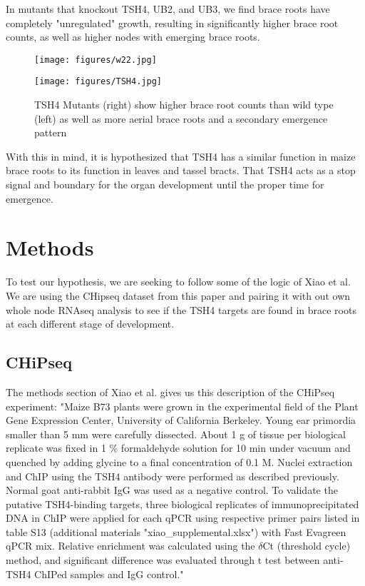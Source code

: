 In mutants that knockout TSH4, UB2, and UB3, we find brace roots have completely "unregulated" growth, resulting in significantly higher brace root counts, as well as higher nodes with emerging brace roots. 

\begin{figure}[H]
    \begin{mdframed}[backgroundcolor=green!20]
    \centering
    \begin{minipage}{0.41\textwidth}
        \centering
        \texttt{[image: figures/w22.jpg]}
    \end{minipage}
    \hfill
    \begin{minipage}{0.41\textwidth}
        \centering
        \texttt{[image: figures/TSH4.jpg]}
    \end{minipage}
    \caption{TSH4 Mutants (right) show higher brace root counts than wild type (left) as well as more aerial brace roots and a secondary emergence pattern}
    \end{mdframed}
\end{figure}

With this in mind, it is hypothesized that TSH4 has a similar function in maize brace roots to its function in leaves and tassel bracts. That TSH4 acts as a stop signal and boundary for the organ development until the proper time for emergence. 

\section{Methods}
To test our hypothesis, we are seeking to follow some of the logic of Xiao et al.\cite{Xiao2022} We are using the CHipseq dataset from this paper and pairing it with out own whole node RNAseq analysis to see if the TSH4 targets are found in brace roots at each different stage of development. 

\subsection{CHiPseq}
The methods section of Xiao et al.\cite{Xiao2022} gives us this description of the CHiPseq experiment:
"Maize B73 plants were grown in the experimental field of the Plant Gene Expression Center, University of California Berkeley. Young ear primordia smaller than 5 mm were carefully dissected. About 1 g of tissue per biological replicate was fixed in 1 \% formaldehyde solution for 10 min under vacuum and quenched by adding glycine to a final concentration of 0.1 M. Nuclei extraction and ChIP using the TSH4 antibody were performed as described previously. \cite{Dong2019} Normal goat anti-rabbit IgG was used as a negative control. To validate the putative TSH4-binding targets, three biological replicates of immunoprecipitated DNA in ChIP were applied for each qPCR using respective primer pairs listed in table S13 (additional materials "xiao\_supplemental.xlsx") with Fast Evagreen qPCR mix. Relative enrichment was calculated using the $\delta$Ct (threshold cycle) method, and significant difference was evaluated through t test between anti-TSH4 ChIPed samples and IgG control." 
